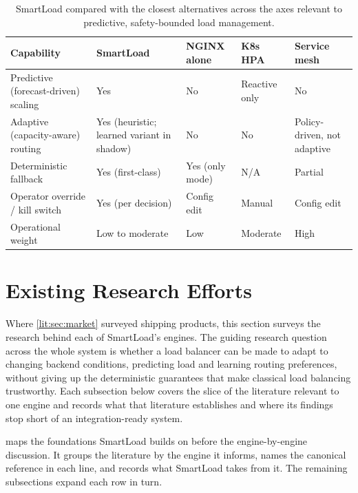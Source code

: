 \begin{table}[H]
\centering
\caption[SmartLoad against the closest alternatives]{SmartLoad compared with the closest alternatives across the axes relevant to predictive, safety-bounded load management.}
\label{lit:tab:market}
\small
\begin{tabularx}{\linewidth}{@{}Y *{4}{>{\centering\arraybackslash}X}@{}}
\toprule
\headrow \textbf{Capability} & \textbf{SmartLoad} & \textbf{NGINX alone} & \textbf{K8s HPA} & \textbf{Service mesh} \\
\midrule
Predictive (forecast-driven) scaling & Yes & No & Reactive only & No \\
Adaptive (capacity-aware) routing     & Yes (heuristic; learned variant in shadow) & No & No & Policy-driven, not adaptive \\
Deterministic fallback                & Yes (first-class) & Yes (only mode) & N/A & Partial \\
Operator override / kill switch       & Yes (per decision) & Config edit & Manual & Config edit \\
Operational weight                    & Low to moderate & Low & Moderate & High \\
\bottomrule
\end{tabularx}
\end{table}

\section{Existing Research Efforts}
\label{lit:sec:research}

Where \cref{lit:sec:market} surveyed shipping products, this section surveys the
research behind each of SmartLoad's engines. The guiding research question
across the whole system is whether a load balancer can be made to adapt to
changing backend conditions, predicting load and learning routing preferences,
without giving up the deterministic guarantees that make classical load
balancing trustworthy. Each subsection below covers the slice of the literature
relevant to one engine and records what that literature establishes and where
its findings stop short of an integration-ready system.

 maps the foundations SmartLoad builds on before the
engine-by-engine discussion. It groups the literature by the engine it informs,
names the canonical reference in each line, and records what SmartLoad takes
from it. The remaining subsections expand each row in turn.

